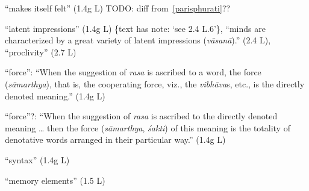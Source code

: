 \documentclass[10pt]{article}
\begin{document}
\begin{multicols}{2}
\begin{enumerate}[
			leftmargin=0em,
			rightmargin=0em,
		]
		 ``makes itself felt'' (1.4g L) TODO: diff from~\ref{parisphurati}??

		 ``latent impressions'' (1.4g L) \{text has note: `see 2.4 L.6'\},
		``minds are characterized by a great variety of latent impressions (\textit{vāsanā}).'' (2.4 L),
		``proclivity'' (2.7 L)

		 ``force'': ``When the suggestion of \textit{rasa} is ascribed to a word, the force (\textit{sāmarthya}), that is, the cooperating force, viz., the \textit{vibhāva}s, etc., is the directly denoted meaning.'' (1.4g L)

		 ``force''?: ``When the suggestion of \textit{rasa} is ascribed to the directly denoted meaning \dots
		then the force (\textit{sāmarthya}, \textit{śakti}) of this meaning is the totality of denotative words arranged in their particular way.'' (1.4g L)

		 ``syntax'' (1.4g L)

		\litem{-------} ``memory elements'' (1.5 L)


\end{enumerate}
\end{multicols}
\end{document}
